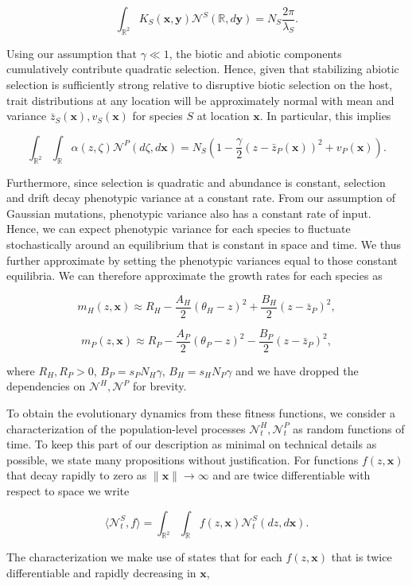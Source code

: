 \documentclass{article}
\begin{document}
\[\int_{\mathbb R^2}K_S(\pmb x,\pmb y)\mathscr N^S(\mathbb R,d\pmb y)=N_S\frac{2\pi}{\lambda_S}.\]

Using our assumption that \(\gamma\ll1\), the biotic and abiotic
components cumulatively contribute quadratic selection. Hence, given
that stabilizing abiotic selection is sufficiently strong relative to
disruptive biotic selection on the host, trait distributions at any
location will be approximately normal with mean and variance
\(\bar z_S(\pmb x),v_S(\pmb x)\) for species \(S\) at location
\(\pmb x\). In particular, this implies

\[\int_{\mathbb R^2}\int_{\mathbb R}\alpha(z,\zeta)\mathscr N^P(d\zeta,d\pmb x)=N_S\left(1-\frac{\gamma}{2}(z-\bar z_P(\pmb x))^2+v_P(\pmb x)\right).\]

Furthermore, since selection is quadratic and abundance is constant,
selection and drift decay phenotypic variance at a constant rate. From
our assumption of Gaussian mutations, phenotypic variance also has a
constant rate of input. Hence, we can expect phenotypic variance for
each species to fluctuate stochastically around an equilibrium that is
constant in space and time. We thus further approximate by setting the
phenotypic variances equal to those constant equilibria. We can
therefore approximate the growth rates for each species as

\[m_H(z,\pmb x)\approx R_H-\frac{A_H}{2}(\theta_H-z)^2+\frac{B_H}{2}(z-\bar z_P)^2,\]

\[m_P(z,\pmb x)\approx R_P-\frac{A_P}{2}(\theta_P-z)^2-\frac{B_P}{2}(z-\bar z_P)^2,\]

where \(R_H,R_P>0\), \(B_P=s_PN_H\gamma\), \(B_H=s_HN_P\gamma\) and we
have dropped the dependencies on \(\mathscr N^H,\mathscr N^P\) for
brevity.

To obtain the evolutionary dynamics from these fitness functions, we
consider a characterization of the population-level processes
\(\mathscr N_t^H,\mathscr N_t^P\) as random functions of time. To keep
this part of our description as minimal on technical details as
possible, we state many propositions without justification. For
functions \(f(z,\pmb x)\) that decay rapidly to zero as
\(\|\pmb x\|\to\infty\) and are twice differentiable with respect to
space we write

\[\langle\mathscr N_t^S,f\rangle=\int_{\mathbb R^2}\int_{\mathbb R}f(z,\pmb x)\mathscr N^S_t(dz,d\pmb x).\]

The characterization we make use of states that for each \(f(z,\pmb x)\)
that is twice differentiable and rapidly decreasing in \(\pmb x\),
\end{document}
